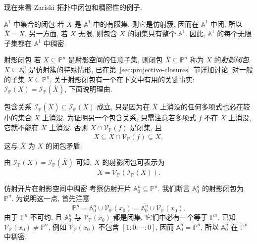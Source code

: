 现在来看 Zariski 拓扑中闭包和稠密性的例子.

\begin{Example}{$\mathbb{A}^{1}$ 中集合的闭包}\leavevmode\label{ex:closures-in-affine-line}
若 $X$ 是 $\mathbb{A}^{1}$ 中的有限集, 则它是仿射簇, 因而在 $\mathbb{A}^{1}$ 中闭, 所以 $\overline{X}=X$. 另一方面, 若 $X$ 无限, 则包含 $X$ 的闭集只有整个 $\mathbb{A}^{1}$. 因此, $\mathbb{A}^{1}$ 的每个无限子集都在 $\mathbb{A}^{1}$ 中稠密.
\end{Example}

\begin{Example}{射影闭包}\leavevmode\label{ex:projective-closure-of-arbitrary-subset}
若 $X\subseteq\mathbb{P}^{n}$ 是射影空间的任意子集, 则闭包 $\overline{X}\subseteq\mathbb{P}^{n}$ 称为 $X$ 的\emph{射影闭包}. $X\subseteq\mathbb{A}^{n}_{0}$ 是仿射簇的特殊情形, 已在第~\ref{sec:projective-closures}~节详加讨论. 对一般的子集 $X\subseteq\mathbb{P}^{n}$, 关于射影闭包有一个在下文中有用的关键事实: $\mathcal{I}_{\mathbb{P}}(X)=\mathcal{I}_{\mathbb{P}}(\overline{X})$, 下面说明理由.

包含关系 $\mathcal{I}_{\mathbb{P}}(\overline{X})\subseteq\mathcal{I}_{\mathbb{P}}(X)$ 成立, 只是因为在 $\overline{X}$ 上消没的任何多项式也必在较小的集合 $X$ 上消没. 为证明另一个包含关系, 只需注意若多项式 $f$ 不在 $\overline{X}$ 上消没, 它就不能在 $X$ 上消没. 否则 $\overline{X}\cap\mathcal{V}_{\mathbb{P}}(f)$ 是闭集, 且
\[
  X\subseteq\overline{X}\cap\mathcal{V}_{\mathbb{P}}(f)\subsetneq\overline{X},
\]
这与 $\overline{X}$ 为 $X$ 的闭包矛盾.

由 $\mathcal{I}_{\mathbb{P}}(X)=\mathcal{I}_{\mathbb{P}}(\overline{X})$ 可知, $X$ 的射影闭包可表示为
\[
  \overline{X}=\mathcal{V}_{\mathbb{P}}(\mathcal{I}_{\mathbb{P}}(X)).
\]
\end{Example}

\begin{Example}{仿射开片在射影空间中稠密}\leavevmode\label{ex:affine-patch-is-dense-in-projective-space}
考察仿射开片 $\mathbb{A}^{n}_{0}\subseteq\mathbb{P}^{n}$. 我们断言 $\mathbb{A}^{n}_{0}$ 的射影闭包为 $\mathbb{P}^{n}$. 为说明这一点, 首先注意
\[
  \mathbb{P}^{n}=\mathbb{A}^{n}_{0}\cup\mathcal{V}_{\mathbb{P}}(x_{0})
    =\overline{\mathbb{A}^{n}_{0}}\cup\mathcal{V}_{\mathbb{P}}(x_{0}).
\]
由于 $\mathbb{P}^{n}$ 不可约, 且 $\overline{\mathbb{A}^{n}_{0}}$ 与 $\mathcal{V}_{\mathbb{P}}(x_{0})$ 都是闭集, 它们中必有一个等于 $\mathbb{P}^{n}$. 已知 $\mathcal{V}_{\mathbb{P}}(x_{0})\ne\mathbb{P}^{n}$, 例如 $\mathcal{V}_{\mathbb{P}}(x_{0})$ 不包含 $[1:0:\cdots:0]$, 因而 $\overline{\mathbb{A}^{n}_{0}}=\mathbb{P}^{n}$, 所以 $\mathbb{A}^{n}_{0}$ 在 $\mathbb{P}^{n}$ 中稠密.
\end{Example}

